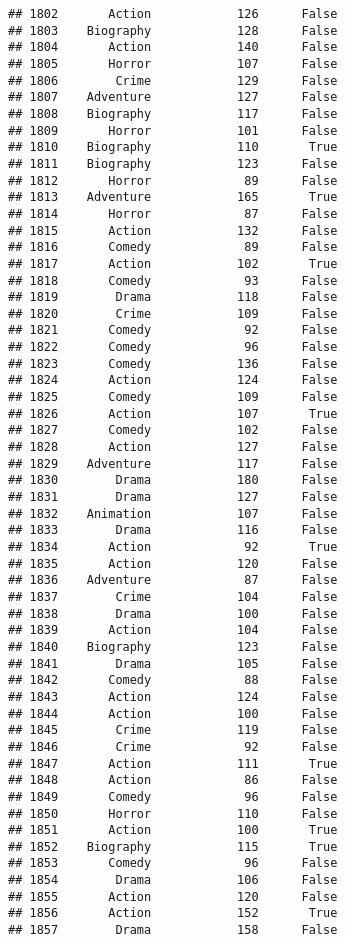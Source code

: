 \documentclass[
]{article}
\begin{document}
\begin{verbatim}
## 1802       Action            126      False
## 1803    Biography            128      False
## 1804       Action            140      False
## 1805       Horror            107      False
## 1806        Crime            129      False
## 1807    Adventure            127      False
## 1808    Biography            117      False
## 1809       Horror            101      False
## 1810    Biography            110       True
## 1811    Biography            123      False
## 1812       Horror             89      False
## 1813    Adventure            165       True
## 1814       Horror             87      False
## 1815       Action            132      False
## 1816       Comedy             89      False
## 1817       Action            102       True
## 1818       Comedy             93      False
## 1819        Drama            118      False
## 1820        Crime            109      False
## 1821       Comedy             92      False
## 1822       Comedy             96      False
## 1823       Comedy            136      False
## 1824       Action            124      False
## 1825       Comedy            109      False
## 1826       Action            107       True
## 1827       Comedy            102      False
## 1828       Action            127      False
## 1829    Adventure            117      False
## 1830        Drama            180      False
## 1831        Drama            127      False
## 1832    Animation            107      False
## 1833        Drama            116      False
## 1834       Action             92       True
## 1835       Action            120      False
## 1836    Adventure             87      False
## 1837        Crime            104      False
## 1838        Drama            100      False
## 1839       Action            104      False
## 1840    Biography            123      False
## 1841        Drama            105      False
## 1842       Comedy             88      False
## 1843       Action            124      False
## 1844       Action            100      False
## 1845        Crime            119      False
## 1846        Crime             92      False
## 1847       Action            111       True
## 1848       Action             86      False
## 1849       Comedy             96      False
## 1850       Horror            110      False
## 1851       Action            100       True
## 1852    Biography            115       True
## 1853       Comedy             96      False
## 1854        Drama            106      False
## 1855       Action            120      False
## 1856       Action            152       True
## 1857        Drama            158      False

\end{verbatim}
\end{document}
